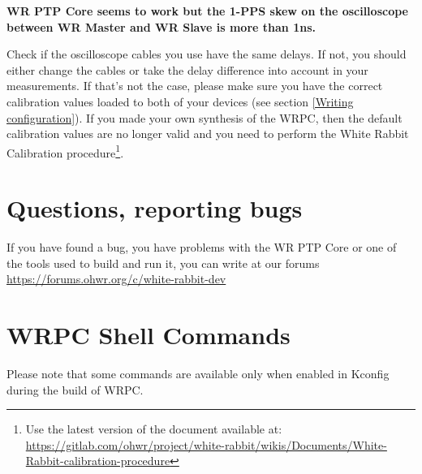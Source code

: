 \documentclass[a4paper, 12pt]{article}
\renewcommand{\_}{\underscore\allowbreak}
\begin{document}
\noindent \textbf{WR PTP Core seems to work but the 1-PPS skew on the
oscilloscope between WR Master and WR Slave is more than 1ns.}

Check if the oscilloscope cables you use have the same delays. If not, you
should either change the cables or take the delay difference into account in your
measurements. If that's not the case, please make sure you have the correct
calibration values loaded to both of your devices (see section \ref{Writing
configuration}). If you made your own synthesis of the WRPC, then the default
calibration values are no longer valid and you need to perform the White Rabbit
Calibration procedure\footnote{Use the latest version of the document available
at: \url{https://gitlab.com/ohwr/project/white-rabbit/wikis/Documents/White-Rabbit-calibration-procedure}}.

\section{Questions, reporting bugs}
\label{Questions}

If you have found a bug, you have problems with the WR PTP Core or one of the
tools used to build and run it, you can write at our forums
\url{https://forums.ohwr.org/c/white-rabbit-dev}




\clearpage
\appendix
\appendixpage
\section{WRPC Shell Commands}
\label{WRPC Shell commands}

Please note that some commands are available only when enabled in Kconfig during
the build of WRPC.

\renewcommand{\descriptionlabel}[1]{\texttt{#1}}
\end{document}
